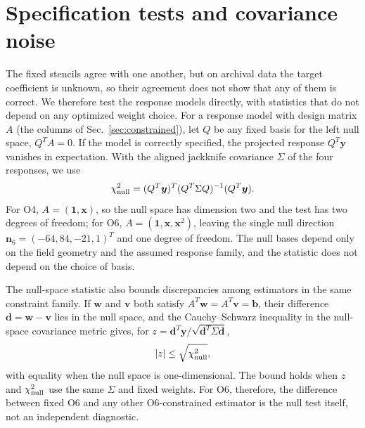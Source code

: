 \documentclass[aps,prd,preprint,nofootinbib,floatfix]{revtex4-2}
\begin{document}
\section{Specification tests and covariance noise}
\label{sec:blue_results}

The fixed stencils agree with one another, but on archival data the target coefficient is unknown, so their agreement does not show that any of them is correct. We therefore test the response models directly, with statistics that do not depend on any optimized weight choice. For a response model with design matrix $A$ (the columns of Sec.~\ref{sec:constrained}), let $Q$ be any fixed basis for the left null space, $Q^TA=0$. If the model is correctly specified, the projected response $Q^T\bm y$ vanishes in expectation. With the aligned jackknife covariance $\Sigma$ of the four responses, we use
\begin{equation}
\chi^2_{\rm null}=(Q^T\bm y)^T(Q^T\Sigma Q)^{-1}(Q^T\bm y).
\label{eq:nullchisq}
\end{equation}
For O4, $A=(\bm 1,\bm x)$, so the null space has dimension two and the test has two degrees of freedom; for O6, $A=(\bm 1,\bm x,\bm x^2)$, leaving the single null direction $\bm n_6=(-64,84,-21,1)^T$ and one degree of freedom. The null bases depend only on the field geometry and the assumed response family, and the statistic does not depend on the choice of basis.

The null-space statistic also bounds discrepancies among estimators in the same constraint family. If $\bm w$ and $\bm v$ both satisfy $A^T\bm w=A^T\bm v=\bm b$, their difference $\bm d=\bm w-\bm v$ lies in the null space, and the Cauchy--Schwarz inequality in the null-space covariance metric gives, for $z=\bm d^T\bm y/\sqrt{\bm d^T\Sigma\bm d}$,
\begin{equation}
|z|\leq\sqrt{\chi^2_{\rm null}},
\label{eq:null_z_bound}
\end{equation}
with equality when the null space is one-dimensional. The bound holds when $z$ and $\chi^2_{\rm null}$ use the same $\Sigma$ and fixed weights. For O6, therefore, the difference between fixed O6 and any other O6-constrained estimator is the null test itself, not an independent diagnostic.
\end{document}
